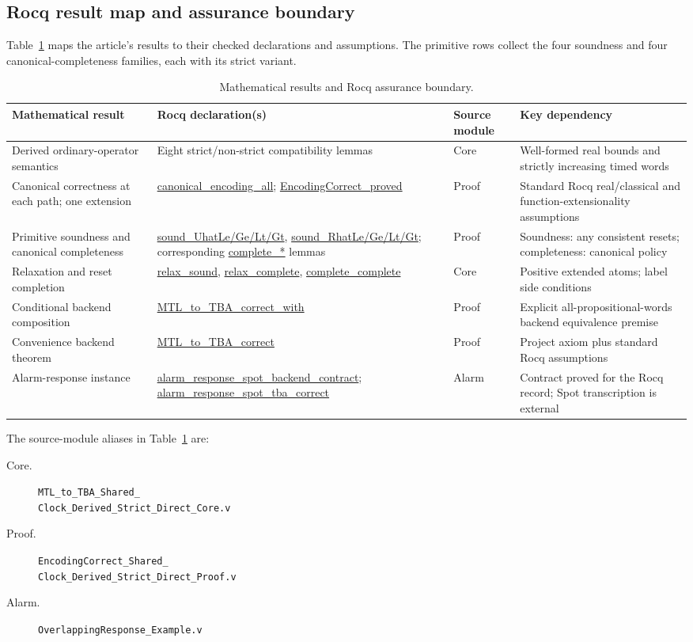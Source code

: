 \documentclass{ieeeaccess}
\newcommand{\Rocqid}[1]{\url{#1}}
\begin{document}
\subsection{Rocq result map and assurance boundary}
\label{subsec:rocq-result-map}
Table~\ref{tab:rocq-result-map} maps the article's results to their checked
declarations and assumptions. The primitive rows collect the four soundness
and four canonical-completeness families, each with its strict variant.
\begin{table}[t]
\centering
\caption{Mathematical results and Rocq assurance boundary.}
\label{tab:rocq-result-map}
\begin{tabular}{@{}p{}p{}p{}p{}@{}}
\toprule
Mathematical result & Rocq declaration(s) & Source module & Key dependency\\
\midrule
Derived ordinary-operator semantics &
Eight strict/non-strict compatibility lemmas &
Core &
Well-formed real bounds and strictly increasing timed words\\
Canonical correctness at each path; one extension &
\Rocqid{canonical_encoding_all};
\Rocqid{EncodingCorrect_proved} &
Proof &
Standard Rocq real/classical and function-extensionality assumptions\\
Primitive soundness and canonical completeness &
\Rocqid{sound_UhatLe/Ge/Lt/Gt},
\Rocqid{sound_RhatLe/Ge/Lt/Gt};
corresponding \Rocqid{complete_*} lemmas &
Proof &
Soundness: any consistent resets; completeness: canonical policy\\
Relaxation and reset completion &
\Rocqid{relax_sound}, \Rocqid{relax_complete},
\Rocqid{complete_complete} &
Core &
Positive extended atoms; label side conditions\\
Conditional backend composition &
\Rocqid{MTL_to_TBA_correct_with} &
Proof &
Explicit all-propositional-words backend equivalence premise\\
Convenience backend theorem &
\Rocqid{MTL_to_TBA_correct} &
Proof &
Project axiom plus standard Rocq assumptions\\
Alarm-response instance &
\Rocqid{alarm_response_spot_backend_contract};
\Rocqid{alarm_response_spot_tba_correct} &
Alarm &
Contract proved for the Rocq record; Spot transcription is external\\
\bottomrule
\end{tabular}
\end{table}

The source-module aliases in Table~\ref{tab:rocq-result-map} are:
\begin{description}
\item[Core.] \texttt{MTL\_to\_TBA\_Shared\_}\\
\texttt{Clock\_Derived\_Strict\_Direct\_Core.v}
\item[Proof.] \texttt{EncodingCorrect\_Shared\_}\\
\texttt{Clock\_Derived\_Strict\_Direct\_Proof.v}
\item[Alarm.] \texttt{OverlappingResponse\_Example.v}
\end{description}
\end{document}
